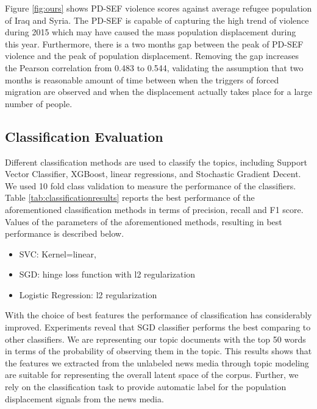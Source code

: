 Figure \ref{fig:ours} shows PD-SEF violence scores against average refugee population of Iraq and Syria. The PD-SEF is capable of capturing the high trend of violence during 2015 which may have caused the mass population displacement during this year. Furthermore, there is a two months gap between the peak of PD-SEF violence and the peak of population displacement. Removing the gap increases the Pearson correlation from 0.483 to 0.544, validating the assumption that two months is reasonable amount of time between when the triggers of forced migration are observed and when the displacement actually takes place for a large number of people.

\subsection{Classification Evaluation}
Different classification methods are used to classify the topics, including Support Vector Classifier, XGBoost, linear regressions, and Stochastic Gradient Decent. We used 10 fold class validation to measure the performance of the classifiers. Table \ref{tab:classificationresults} reports the best performance of the aforementioned classification methods in terms of precision, recall and F1 score. Values of the parameters of the aforementioned methods, resulting in best performance is described below.
\begin{itemize}
\item SVC: Kernel=linear,
\item SGD: hinge loss function with l2 regularization
\item Logistic Regression: l2 regularization
\end{itemize}
With the choice of best features the performance of classification has considerably improved.
Experiments reveal that SGD classifier performs the best comparing to other classifiers. We are representing our topic documents with the top 50 words in terms of the probability of observing them in the topic. This results shows that the features we extracted from the unlabeled news media through topic modeling are suitable for representing the overall latent space of the corpus. Further, we rely on the classification task to provide automatic label for the population displacement signals from the news media. 

